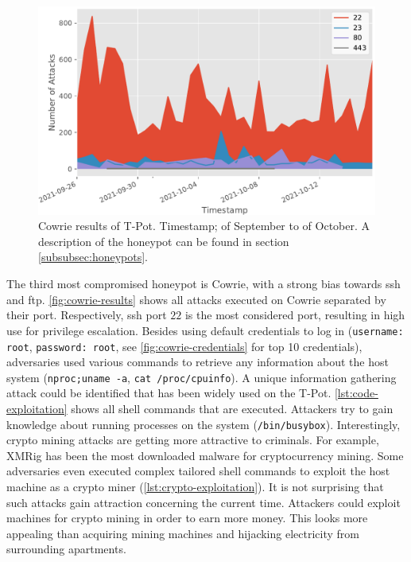 \begin{figure}[htbp]
    \centering
    \includegraphics[width=\textwidth]{figures/tpot-cowrie-port.pdf}
    \caption[Cowrie results of T-Pot]{
        Cowrie results of T-Pot.
        Timestamp;  of September to  of October.
        A description of the honeypot can be found in section \ref{subsubsec:honeypots}.
    }
    \label{fig:cowrie-results}
\end{figure}

The third most compromised honeypot is Cowrie, with a strong bias towards \ac{ssh} and \ac{ftp}.
\autoref{fig:cowrie-results} shows all attacks executed on Cowrie separated by their port.
Respectively, \ac{ssh} port $22$ is the most considered port, resulting in high use for privilege escalation.
Besides using default credentials to log in (\verb|username: root|, \verb|password: root|, see \autoref{fig:cowrie-credentials} for top 10 credentials), adversaries used various commands to retrieve any information about the host system (\verb|nproc;uname -a|, \verb|cat /proc/cpuinfo|).
A unique information gathering attack could be identified that has been widely used on the T-Pot.
\autoref{lst:code-exploitation} shows all shell commands that are executed.
Attackers try to gain knowledge about running processes on the system (\verb|/bin/busybox|).
Interestingly, crypto mining attacks are getting more attractive to criminals.
For example, XMRig has been the most downloaded malware for cryptocurrency mining.
Some adversaries even executed complex tailored shell commands to exploit the host machine as a crypto miner (\autoref{lst:crypto-exploitation}).
It is not surprising that such attacks gain attraction concerning the current time.
Attackers could exploit machines for crypto mining in order to earn more money.
This looks more appealing than acquiring mining machines and hijacking electricity from surrounding apartments.

